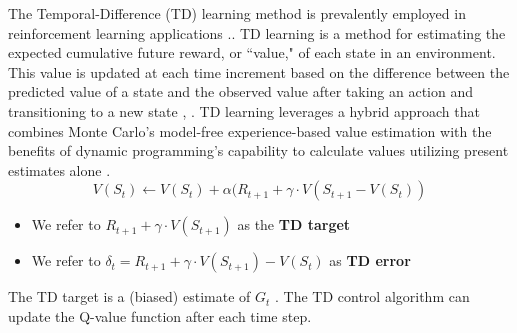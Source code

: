 The Temporal-Difference (TD) learning method is prevalently employed in reinforcement learning applications \cite{RL3}.. TD learning is a method for estimating the expected cumulative future reward, or ``value," of each state in an environment. This value is updated at each time increment based on the difference between the predicted value of a state and the observed value after taking an action and transitioning to a new state \cite{RL}, \cite{RL2}.
TD learning leverages a hybrid approach that combines Monte Carlo's model-free experience-based value estimation with the benefits of dynamic programming's capability to calculate values utilizing present estimates alone \cite{sutton1988b}. 
\begin{equation}
    V(S_t) \leftarrow V(S_t) + \alpha(R_{t+1} + \gamma \cdot V(S_{t+1} - V(S_t))
\end{equation}
\begin{itemize}
    \item We refer to $R_{t+1} + \gamma \cdot V(S_{t+1})$ as the \textbf{TD target}
    \item We refer to $\delta_{t} = R_{t+1} + \gamma \cdot V(S_{t+1}) - V(S_{t})$ as  \textbf{TD error}
\end{itemize}
The TD target is a (biased) estimate of $G_t$ \cite{RL}. The TD control algorithm can update the Q-value function after each time step. 



